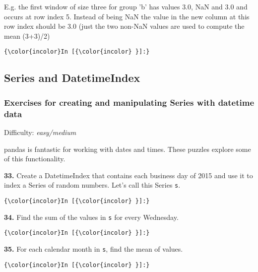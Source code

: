 \documentclass[11pt]{article}
\begin{document}
E.g. the first window of size three for group 'b' has values 3.0, NaN
and 3.0 and occurs at row index 5. Instead of being NaN the value in the
new column at this row index should be 3.0 (just the two non-NaN values
are used to compute the mean (3+3)/2)

    \begin{Verbatim}[commandchars=\\\{\}]
{\color{incolor}In [{\color{incolor} }]:} 
\end{Verbatim}


    \subsection{Series and DatetimeIndex}\label{series-and-datetimeindex}

\subsubsection{Exercises for creating and manipulating Series with
datetime
data}\label{exercises-for-creating-and-manipulating-series-with-datetime-data}

Difficulty: \emph{easy/medium}

pandas is fantastic for working with dates and times. These puzzles
explore some of this functionality.

    \textbf{33.} Create a DatetimeIndex that contains each business day of
2015 and use it to index a Series of random numbers. Let's call this
Series \texttt{s}.

    \begin{Verbatim}[commandchars=\\\{\}]
{\color{incolor}In [{\color{incolor} }]:} 
\end{Verbatim}


    \textbf{34.} Find the sum of the values in \texttt{s} for every
Wednesday.

    \begin{Verbatim}[commandchars=\\\{\}]
{\color{incolor}In [{\color{incolor} }]:} 
\end{Verbatim}


    \textbf{35.} For each calendar month in \texttt{s}, find the mean of
values.

    \begin{Verbatim}[commandchars=\\\{\}]
{\color{incolor}In [{\color{incolor} }]:} 
\end{Verbatim}
\end{document}

